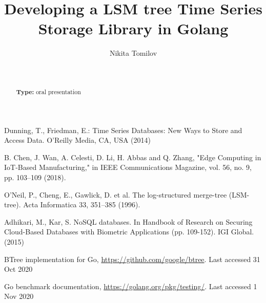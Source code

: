 \documentclass[runningheads]{llncs}
\begin{document}
%
\title{Developing a LSM tree Time Series Storage Library in Golang}
%
%
\author{Nikita Tomilov}
%
%
%
\maketitle              %
%
\begin{abstract}


\\
\\
\textbf{Type:} oral presentation
\end{abstract}
%
%
%




%
%
%
% 
% 
%
\begin{thebibliography}{8}
Dunning, T., Friedman, E.: Time Series Databases: New Ways to Store and Access Data. O'Reilly Media, CA, USA  (2014)

B. Chen, J. Wan, A. Celesti, D. Li, H. Abbas and Q. Zhang, "Edge Computing in IoT-Based Manufacturing," in IEEE Communications Magazine, vol. 56, no. 9, pp. 103--109 (2018). 

O’Neil, P., Cheng, E., Gawlick, D. et al. The log-structured merge-tree (LSM-tree). Acta Informatica 33, 351--385 (1996). 

Adhikari, M., Kar, S. NoSQL databases. In Handbook of Research on Securing Cloud-Based Databases with Biometric Applications (pp. 109-152). IGI Global. (2015)

BTree implementation for Go, \url{https://github.com/google/btree}. Last accessed 31
Oct 2020

Go benchmark documentation, \url{https://golang.org/pkg/testing/}. Last accessed 1
Nov 2020

\end{thebibliography}
\end{document}
